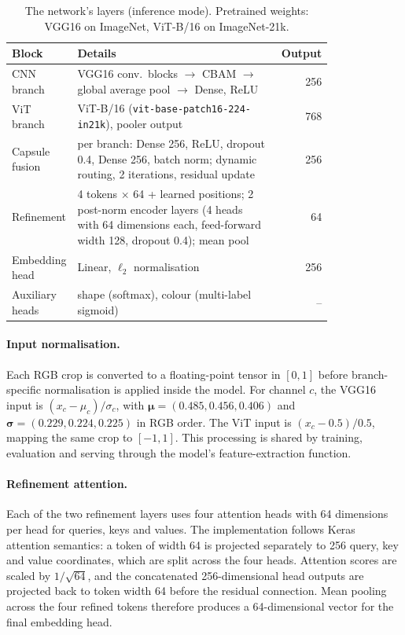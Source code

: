 \begin{table}[!htbp]
  \caption{The network's layers (inference mode). Pretrained weights: VGG16 on ImageNet, ViT-B/16 on ImageNet-21k.}
  \label{tab:arch}
  \centering
  \small
  \begin{tabular}{@{}p{0.19\linewidth}p{0.62\linewidth}r@{}}
    \toprule
    Block & Details & Output \\
    \midrule
    CNN branch & VGG16 conv.\ blocks $\to$ CBAM $\to$ global average pool $\to$ Dense, ReLU & 256 \\
    ViT branch & ViT-B/16 (\texttt{vit-base-patch16-224-in21k}), pooler output & 768 \\
    Capsule fusion & per branch: Dense 256, ReLU, dropout 0.4, Dense 256, batch norm; dynamic routing, 2 iterations,
      residual update & 256 \\
    Refinement & 4 tokens $\times$ 64 + learned positions; 2 post-norm encoder layers (4 heads with 64 dimensions each, feed-forward width 128, dropout
      0.4); mean pool & 64 \\
    Embedding head & Linear, $\ell_2$ normalisation & 256 \\
    Auxiliary heads & shape (softmax), colour (multi-label sigmoid) & -- \\
    \bottomrule
  \end{tabular}
\end{table}

\paragraph{Input normalisation.} Each RGB crop is converted to a floating-point tensor in $[0,1]$ before branch-specific normalisation is applied inside the model. For channel $c$, the VGG16 input is $(x_c-\mu_c)/\sigma_c$, with $\boldsymbol{\mu}=(0.485,0.456,0.406)$ and $\boldsymbol{\sigma}=(0.229,0.224,0.225)$ in RGB order. The ViT input is $(x_c-0.5)/0.5$, mapping the same crop to $[-1,1]$. This processing is shared by training, evaluation and serving through the model's feature-extraction function.

\paragraph{Refinement attention.} Each of the two refinement layers uses four attention heads with 64 dimensions per head for queries, keys and values. The implementation follows Keras attention semantics: a token of width 64 is projected separately to 256 query, key and value coordinates, which are split across the four heads. Attention scores are scaled by $1/\sqrt{64}$, and the concatenated 256-dimensional head outputs are projected back to token width 64 before the residual connection. Mean pooling across the four refined tokens therefore produces a 64-dimensional vector for the final embedding head.


